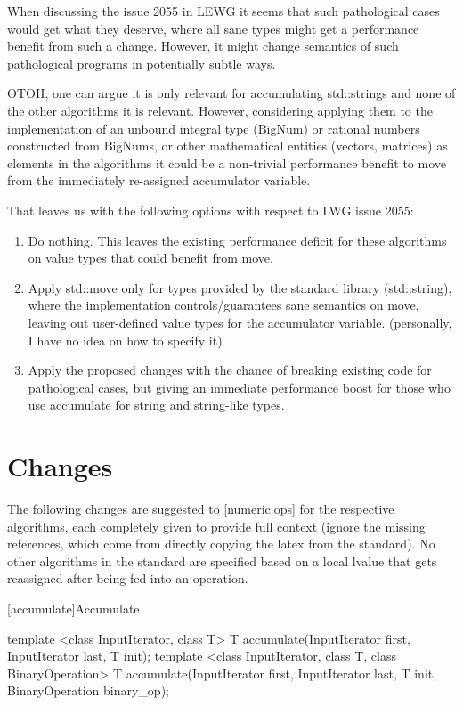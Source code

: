\documentclass[ebook,11pt,article]{memoir}
\begin{document}
When discussing the issue 2055 in LEWG it seems that such pathological cases would get what they deserve, where all sane types might get a performance benefit from such a change. However, it might change semantics of such pathological programs in potentially subtle ways.

OTOH, one can argue it is only relevant for accumulating std::strings and none of the other algorithms it is relevant. However, considering applying them to the implementation of an unbound integral type (BigNum) or rational numbers constructed from BigNums, or other mathematical entities (vectors, matrices) as elements in the algorithms it could be a non-trivial performance benefit to move from the immediately re-assigned accumulator variable.

That leaves us with the following options with respect to LWG issue 2055:
\begin{enumerate}
\item Do nothing. This leaves the existing performance deficit for these algorithms on value types that could benefit from move.
\item Apply std::move only for types provided by the standard library (std::string), where the implementation controls/guarantees sane semantics on move, leaving out user-defined value types for the accumulator variable. (personally, I have no idea on how to specify it)
\item Apply the proposed changes with the chance of breaking existing code for pathological cases, but giving an immediate performance boost for those who use accumulate for string and string-like types.
\end{enumerate}


\chapter{Changes}
The following changes are suggested to [numeric.ops] for the respective algorithms, each completely given to provide full context 
(ignore the missing references, which come from directly copying the latex from the standard). No other algorithms in the standard are specified based on a local lvalue that gets reassigned after being fed into an operation.


[accumulate]{Accumulate}

%
\begin{itemdecl}
template <class InputIterator, class T>
  T accumulate(InputIterator first, InputIterator last, T init);
template <class InputIterator, class T, class BinaryOperation>
  T accumulate(InputIterator first, InputIterator last, T init,
               BinaryOperation binary_op);
\end{itemdecl}
\end{document}

